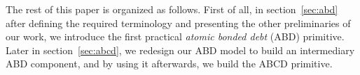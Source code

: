 







 
The rest of this paper is organized as follows. First of all, in section~\ref{sec:abd} after defining the required terminology and presenting the other preliminaries of our work, we introduce the first practical \emph{atomic bonded debt} (ABD) primitive. Later in section~\ref{sec:abcd}, we redesign our ABD model to build an intermediary ABD component, and by using it afterwards, we build the ABCD primitive. 

